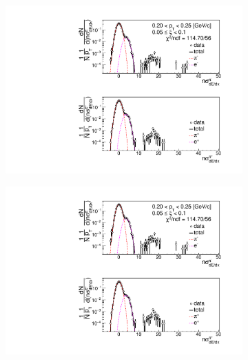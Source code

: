 \begin{figure}[h!]
\begin{subfigure}{.33\textwidth}
	\end{subfigure}
	\begin{subfigure}{.33\textwidth}
		\includegraphics[width=\linewidth, page=8]{chapters/chrgSTAR/img/dEdx/fit2019_secondStep_0_1.pdf}
	\end{subfigure}
	\begin{subfigure}{.3\textwidth}
		\includegraphics[width=\linewidth, page=9]{chapters/chrgSTAR/img/dEdx/fit2019_secondStep_0_1.pdf}
	\end{subfigure}
	\begin{subfigure}{.3\textwidth}

\end{subfigure}
\end{figure}
